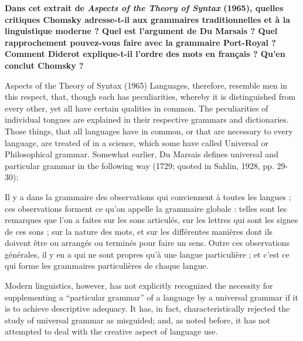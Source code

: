 \begin{keybox}[I]
\textbf{Dans cet extrait de \textit{Aspects of the Theory of Syntax} (1965), quelles critiques Chomsky adresse-t-il aux grammaires traditionnelles et à la linguistique moderne ? Quel est l’argument de Du Marsais ? Quel rapprochement pouvez-vous faire avec la grammaire Port-Royal ? Comment Diderot explique-t-il l’ordre des mots en français ? Qu’en conclut Chomsky ?}

\begin{lecture}{Aspects of the Theory of Syntax (1965)}
Languages, therefore, resemble men in this respect, that, though each has peculiarities, whereby it is distinguished from every other, yet all have certain qualities in common. The peculiarities of individual tongues are explained in their respective grammars and dictionaries. Those things, that all languages have in common, or that are necessary to every language, are treated of in a science, which some have called Universal or Philosophical grammar. Somewhat earlier, Du Marsais defines universal and particular grammar in the following way (1729; quoted in Sahlin, 1928, pp. 29-30):

Il y a dans la grammaire des observations qui conviennent à toutes les langues ; ces observations forment ce qu’on appelle la grammaire globale : telles sont les remarques que l’on a faites sur les sons articulés, sur les lettres qui sont les signes de ces sons ; sur la nature des mots, et sur les différentes manières dont ils doivent être ou arrangés ou terminés pour faire un sens. Outre ces observations générales, il y en a qui ne sont propres qu’à une langue particulière ; et c’est ce qui forme les grammaires particulières de chaque langue.

Modern linguistics, however, has not explicitly recognized the necessity for supplementing a “particular grammar” of a language by a universal grammar if it is to achieve descriptive adequacy. It has, in fact, characteristically rejected the study of universal grammar as misguided; and, as noted before, it has not attempted to deal with the creative aspect of language use.


\end{lecture}
\end{keybox}
